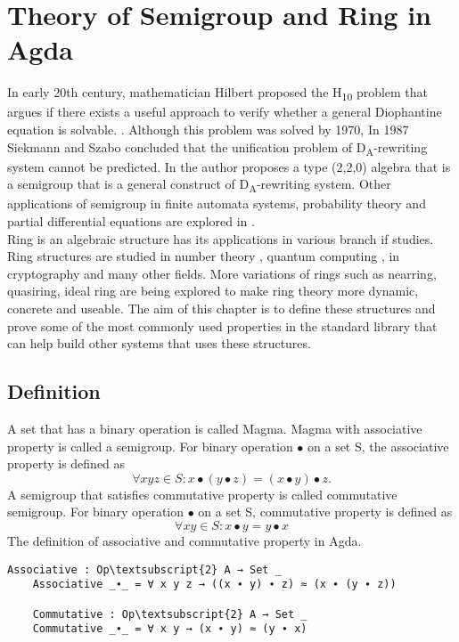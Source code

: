 \chapter{Theory of Semigroup and Ring in Agda}
In early 20th century, mathematician Hilbert proposed the H\textsubscript{10} problem that argues if there exists a useful approach to verify whether a general Diophantine equation is solvable. \cite{larchey2020hilbert}. Although this problem was solved by 1970, In 1987 Siekmann and Szabo concluded that the unification problem of D\textsubscript{A}-rewriting system cannot be predicted. In \cite{deng2016characterizations} the author proposes a type (2,2,0) algebra that is a semigroup that is a general construct of D\textsubscript{A}-rewriting system. Other applications of semigroup in finite automata systems, probability theory and partial differential equations are explored in \cite{liaqat2021some}.\\

Ring is an algebraic structure has its applications in various branch if studies. Ring structures are studied in number theory \cite{noauthor_undated-eq}, quantum computing \cite{netto2008influence}, in cryptography \cite{ringcrypt} and many other fields. More variations of rings such as nearring, quasiring, ideal ring are being explored to make ring theory more dynamic, concrete and useable. The aim of this chapter is to define these structures and prove some of the most commonly used properties in the standard library that can help build other systems that uses these structures.
\section{Definition}
A set that has a binary operation is called Magma. Magma with associative property is called a semigroup. For binary operation \(∙\) on a set S, the associative property is defined as 
\begin{equation}
\forall x y z \in S : x ∙ (y ∙ z) = (x ∙ y) ∙ z.
\end{equation}
 A semigroup that satisfies commutative property is called commutative semigroup. For binary operation \( ∙ \) on a set S, commutative property is defined as 
\begin{equation}
\forall x y \in S : x ∙ y = y ∙ x
\end{equation}
The definition of associative and commutative property in Agda.
\begin{Verbatim}[commandchars=\\\{\},samepage=true]
	Associative : Op\textsubscript{2} A → Set _
	Associative _∙_ = ∀ x y z → ((x ∙ y) ∙ z) ≈ (x ∙ (y ∙ z))

	Commutative : Op\textsubscript{2} A → Set _
	Commutative _∙_ = ∀ x y → (x ∙ y) ≈ (y ∙ x)
\end{Verbatim}

